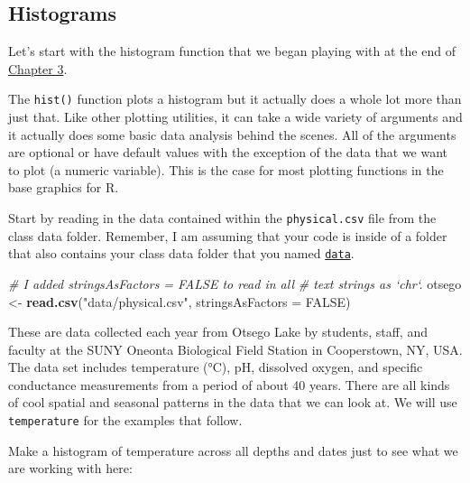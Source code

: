 \documentclass[
]{book}
\newenvironment{Shaded}{\begin{snugshade}}{\end{snugshade}}
\newcommand{\CommentTok}[1]{\textcolor[rgb]{0.56,0.35,0.01}{\textit{#1}}}
\newcommand{\DataTypeTok}[1]{\textcolor[rgb]{0.13,0.29,0.53}{#1}}
\newcommand{\KeywordTok}[1]{\textcolor[rgb]{0.13,0.29,0.53}{\textbf{#1}}}
\newcommand{\NormalTok}[1]{#1}
\newcommand{\OperatorTok}[1]{\textcolor[rgb]{0.81,0.36,0.00}{\textbf{#1}}}
\newcommand{\OtherTok}[1]{\textcolor[rgb]{0.56,0.35,0.01}{#1}}
\newcommand{\StringTok}[1]{\textcolor[rgb]{0.31,0.60,0.02}{#1}}
\begin{document}
\hypertarget{histograms}{%
\subsection{Histograms}\label{histograms}}

Let's start with the histogram function that we began playing with at the end of \protect\hyperlink{stochastic}{Chapter 3}.

The \texttt{hist()} function plots a histogram but it actually does a whole lot more than just that. Like other plotting utilities, it can take a wide variety of arguments and it actually does some basic data analysis behind the scenes. All of the arguments are optional or have default values with the exception of the data that we want to plot (a numeric variable). This is the case for most plotting functions in the base graphics for R.

Start by reading in the data contained within the \texttt{physical.csv} file from the class data folder. Remember, I am assuming that your code is inside of a folder that also contains your class data folder that you named \href{https://danstich.github.io/stich/classes/BIOL217/software.html}{\texttt{data}}.

\begin{Shaded}
\begin{Highlighting}[]
\CommentTok{# I added stringsAsFactors = FALSE to read in all}
\CommentTok{# text strings as `chr`.}
\NormalTok{ otsego <-}\StringTok{ }\KeywordTok{read.csv}\NormalTok{(}\StringTok{"data/physical.csv"}\NormalTok{, }\DataTypeTok{stringsAsFactors =} \OtherTok{FALSE}\NormalTok{)}
\end{Highlighting}
\end{Shaded}

These are data collected each year from Otsego Lake by students, staff, and faculty at the SUNY Oneonta Biological Field Station in Cooperstown, NY, USA. The data set includes temperature (°C), pH, dissolved oxygen, and specific conductance measurements from a period of about 40 years. There are all kinds of cool spatial and seasonal patterns in the data that we can look at. We will use \texttt{temperature} for the examples that follow.

Make a histogram of temperature across all depths and dates just to see what we are working with here:

\begin{Shaded}
\end{Shaded}
\end{document}
